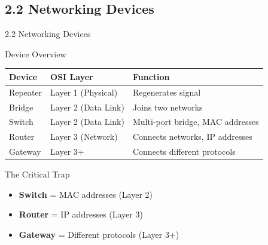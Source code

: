 \documentclass{beamer}
\begin{document}
	\subsection{2.2 Networking Devices}
	\begin{frame}{2.2 Networking Devices}
		\begin{block}{Device Overview}
			\begin{tabular}{|p{2.5cm}|p{4cm}|p{4.5cm}|}
				\hline
				\textbf{Device} & \textbf{OSI Layer} & \textbf{Function} \\
				\hline
				Repeater & Layer 1 (Physical) & Regenerates signal \\
				\hline
				Bridge & Layer 2 (Data Link) & Joins two networks \\
				\hline
				Switch & Layer 2 (Data Link) & Multi-port bridge, MAC addresses \\
				\hline
				Router & Layer 3 (Network) & Connects networks, IP addresses \\
				\hline
				Gateway & Layer 3+ & Connects different protocols \\
				\hline
			\end{tabular}
		\end{block}
		
		\begin{alertblock}{The Critical Trap}
			\begin{itemize}
				\item \textbf{Switch} = MAC addresses (Layer 2)
				\item \textbf{Router} = IP addresses (Layer 3)
				\item \textbf{Gateway} = Different protocols (Layer 3+)
			\end{itemize}
		\end{alertblock}
	\end{frame}
	
\end{document}
